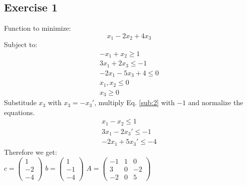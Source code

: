 \documentclass{article}
\begin{document}
\subsection*{Exercise 1}
Function to minimize:
\begin{equation}
	x_1-2x_2+4x_3
\end{equation}
Subject to:
\begin{eqnarray} \label{sub:2}
	-x_1+x_2 \geq 1 \\
	3x_1+2x_3 \leq -1 \\
	-2x_1-5x_3+4 \leq 0 \\
	x_1,x_2 \leq 0 \\
	x_3 \geq 0
\end{eqnarray}
Substitude $x_3$ with $x_3 = -x_3'$, multiply Eq. \ref{sub:2} with $-1$ and normalize the equations.
\begin{eqnarray}
	x_1-x_2 \leq 1 \\
	3x_1-2x_3' \leq -1 \\
	-2x_1+5x_3' \leq -4
\end{eqnarray}
Therefore we get:\\
$c = \begin{pmatrix}1\\-2\\-4\end{pmatrix}$
$b = \begin{pmatrix}1\\-1\\-4\end{pmatrix}$
$A = \begin{pmatrix}-1 & 1 & 0\\3 & 0 & -2\\-2 & 0 & 5\end{pmatrix}$

\newpage
\end{document}
